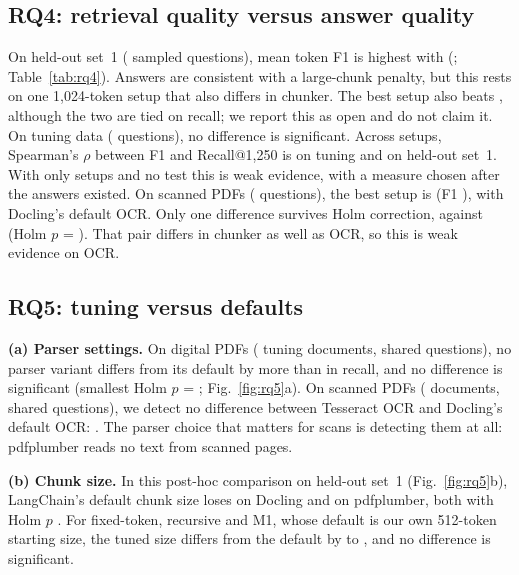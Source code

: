 \subsection{RQ4: retrieval quality versus answer quality}\label{sec:rq4}



On held-out set~1 (\AQHeldOutQuestions{} sampled questions), mean token F1 is
highest with \RQfourBest{} (\RQfourBestFOne{}; Table~\ref{tab:rq4}). Answers are
consistent with a large-chunk penalty, but this rests on one 1,024-token setup
that also differs in chunker. The best setup also beats
\RQfourDoclingMethodOneTreeTThreeEightFourSetup{}, although the two are tied on
recall; we report this as open and do not claim it. On tuning data
(\AQTuningQuestions{} questions), no difference is significant.  Across setups, Spearman's $\rho$ between F1
and Recall@1,250 is \RQfourSpearmanTuningFOne{} on tuning and
\RQfourSpearmanHeldOutFOne{} on held-out set~1. With only \RQfourSetups{} setups and
no test this is weak evidence, with a measure chosen after the answers existed.
On scanned PDFs (\AQScannedQuestions{} questions), the best setup is
\RQfourScannedBest{} (F1 \RQfourScannedBestFOne{}), with Docling's default OCR. Only one difference survives Holm correction, against
\RQfourScannedTopSetup{} (Holm $p$ = \RQfourScannedTopHolm{}). That pair differs in chunker as well as OCR, so this is
weak evidence on OCR.

\subsection{RQ5: tuning versus defaults}\label{sec:rq5}

\tuningfigure

\textbf{(a) Parser settings.} On digital PDFs (\RQfiveADigitalDocuments{} tuning
documents, \RQfiveADigitalQuestions{} shared questions), no parser variant differs
from its default by more than \RQfiveADigitalMaxAbsDiff{} in recall, and no
difference is significant (smallest Holm $p$ = \RQfiveADigitalMinHolm{};
Fig.~\ref{fig:rq5}a). On scanned PDFs (\RQfiveAScannedDocuments{} documents,
\RQfiveAScannedQuestions{} shared questions), we detect no difference between
Tesseract OCR and Docling's default OCR: \RQfiveAScannedDiff{} \RQfiveAScannedCI{}.
The parser choice that matters for scans is detecting them at all: pdfplumber
reads no text from scanned pages.

\textbf{(b) Chunk size.} In this post-hoc comparison on held-out set~1
(Fig.~\ref{fig:rq5}b), LangChain's default chunk size loses
\RQfiveBLangchainRecursiveDoclingDiff{} \RQfiveBLangchainRecursiveDoclingCI{} on
Docling and \RQfiveBLangchainRecursivePdfplumberDiff{}
\RQfiveBLangchainRecursivePdfplumberCI{} on pdfplumber, both with Holm $p$
\RQfiveBLangchainRecursiveDoclingHolm{}. For fixed-token, recursive and M1, whose
default is our own 512-token starting size, the tuned size differs from the
default by \RQfiveBRecursiveDoclingDiff{} to \RQfiveBMethodOneTreePdfplumberDiff{},
and no difference is significant.


